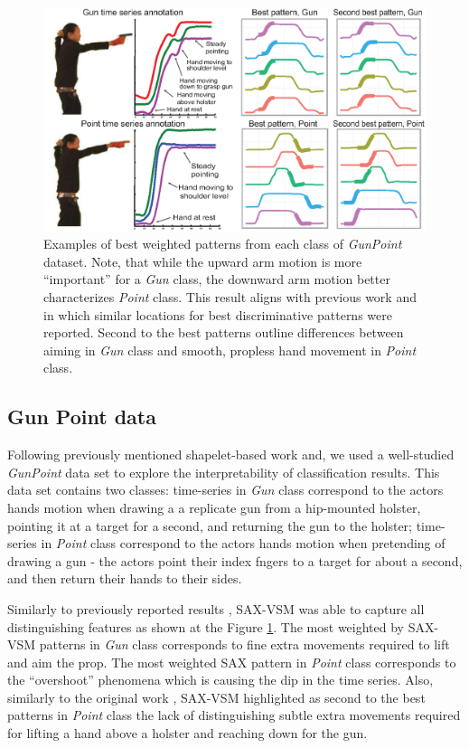 \documentclass{llncs}
\newcommand{\myfigureshrinker}{\vspace{-1cm}}
\begin{document}
\begin{figure}[t]
   \myfigureshrinker
   \centering
   \includegraphics[width=115mm]{figures/gun-point.eps}
   \caption{Examples of best weighted patterns from each class of \textit{GunPoint} dataset. 
   Note, that while the upward arm motion is more ``important'' for a \textit{Gun} class, 
   the downward arm motion better characterizes \textit{Point} class. 
   This result aligns with previous work \cite{shapelet} and \cite{bagnal} in which similar 
   locations for best discriminative patterns were reported. 
   Second to the best patterns outline differences between aiming in \textit{Gun} class and
   smooth, propless hand movement in \textit{Point} class.
   }
   \label{fig:shapelet-like-patterns}
\end{figure}

\subsection{Gun Point data}
Following previously mentioned shapelet-based work \cite{shapelet} and\cite{bagnal}, 
we used a well-studied \textit{GunPoint} data set \cite{gun} to explore the 
interpretability of classification results. This data set contains two classes: 
time-series in \textit{Gun} class correspond to the actors hands motion when drawing a 
a replicate gun from a hip-mounted holster, pointing it at a target for a second,
and returning the gun to the holster; 
time-series in \textit{Point} class correspond to the actors hands motion when pretending
of drawing a gun - the actors point their index fngers to a target for about a second, 
and then return their hands to their sides. 

Similarly to previously reported results \cite{shapelet} \cite{bagnal}, 
SAX-VSM was able to capture all distinguishing features as shown at the 
Figure \ref{fig:shapelet-like-patterns}. The most weighted by SAX-VSM patterns in 
\textit{Gun} class corresponds to fine extra movements required to lift and aim the prop. 
The most weighted SAX pattern in \textit{Point} class corresponds to the ``overshoot''
phenomena which is causing the dip in the time series. 
Also, similarly to the original work \cite{gun}, SAX-VSM highlighted as second to the best
patterns in \textit{Point} class the lack of distinguishing subtle extra movements required
for lifting a hand above a holster and reaching down for the gun.
\end{document}
